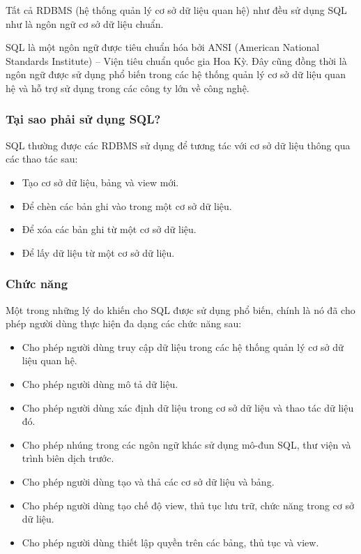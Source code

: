 Tất cả RDBMS (hệ thống quản lý cơ sở dữ liệu quan hệ) như đều sử dụng SQL như là ngôn ngữ cơ sở dữ liệu chuẩn.

SQL là một ngôn ngữ được tiêu chuẩn hóa bởi ANSI (American National Standards Institute) – Viện tiêu chuẩn quốc gia Hoa Kỳ. Đây cũng đồng thời là ngôn ngữ được sử dụng phổ biến trong các hệ thống quản lý cơ sở dữ liệu quan hệ và hỗ trợ sử dụng trong các công ty lớn về công nghệ.
\subsubsection{Tại sao phải sử dụng SQL?}
SQL thường được các RDBMS sử dụng để tương tác với cơ sở dữ liệu thông qua các thao tác sau:
\begin{itemize}
    \item Tạo cơ sở dữ liệu, bảng và view mới.
    \item Để chèn các bản ghi vào trong một cơ sở dữ liệu.
    \item Để xóa các bản ghi từ một cơ sở dữ liệu.
    \item Để lấy dữ liệu từ một cơ sở dữ liệu.
\end{itemize}
\subsubsection{Chức năng}
Một trong những lý do khiến cho SQL được sử dụng phổ biến, chính là nó đã cho phép người dùng thực hiện đa dạng các chức năng sau:
\begin{itemize}
    \item Cho phép người dùng truy cập dữ liệu trong các hệ thống quản lý cơ sở dữ liệu quan hệ.
    \item Cho phép người dùng mô tả dữ liệu.
    \item Cho phép người dùng xác định dữ liệu trong cơ sở dữ liệu và thao tác dữ liệu đó.
    \item Cho phép nhúng trong các ngôn ngữ khác sử dụng mô-đun SQL, thư viện và trình biên dịch trước.
    \item Cho phép người dùng tạo và thả các cơ sở dữ liệu và bảng.
    \item Cho phép người dùng tạo chế độ view, thủ tục lưu trữ, chức năng trong cơ sở dữ liệu.
    \item Cho phép người dùng thiết lập quyền trên các bảng, thủ tục và view.
\end{itemize}

